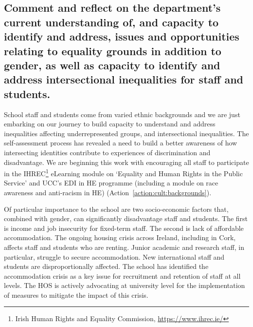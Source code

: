 \subsection{Comment and reflect on the department’s current understanding of, and capacity to identify and address, issues and opportunities relating to equality grounds in addition to gender, as well as capacity to identify and address intersectional inequalities for staff and students.}

School staff and students come from varied ethnic backgrounds and we are just embarking on our journey to build capacity to understand and address inequalities affecting underrepresented groups, and intersectional inequalities. The self-assessment process has revealed a need to build a better awareness of how intersecting identities contribute to experiences of discrimination and disadvantage. We are beginning this work with encouraging all staff to participate in the IHREC\footnote{Irish Human Rights and Equality Commission, \url{https://www.ihrec.ie/}} eLearning module on ‘Equality and Human Rights in the Public Service’ and UCC’s EDI in \ac{HE} programme (including a module on race awareness and anti-racism in HE) (Action~\ref{action:cult:backgrounds}). 



Of particular importance to the school are two socio-economic factors that, combined with gender, can significantly disadvantage staff and students. The first is income and job insecurity for fixed-term staff. The second is lack of affordable accommodation. The ongoing housing crisis across Ireland, including in Cork, affects staff and students who are renting. Junior academic and research staff, in particular, struggle to secure accommodation. New international staff and students are disproportionally affected. The school has identified the accommodation crisis as a key issue for recruitment and retention of staff at all levels. The \ac{HOS} is actively advocating at university level for the implementation of measures  to mitigate the impact of this crisis.



